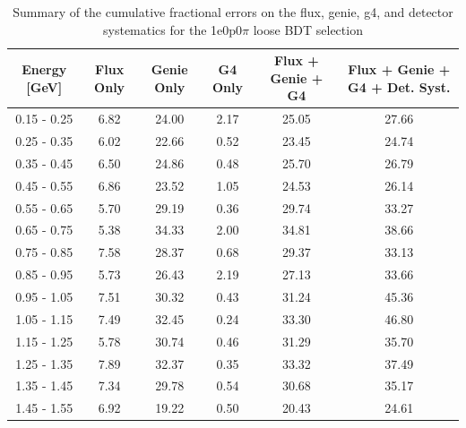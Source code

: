 \begin{table}[H]
\centering
\begin{tabular}{| c | c | c | c | c | c |}
\hline
Energy [GeV] & Flux Only & Genie Only  & G4 Only & Flux + Genie + G4 & Flux + Genie + G4 + Det. Syst. \\
\hline
0.15 - 0.25 & 6.82 & 24.00 & 2.17 & 25.05 & 27.66 \\
0.25 - 0.35 & 6.02 & 22.66 & 0.52 & 23.45 & 24.74 \\
0.35 - 0.45 & 6.50 & 24.86 & 0.48 & 25.70 & 26.79 \\
0.45 - 0.55 & 6.86 & 23.52 & 1.05 & 24.53 & 26.14 \\
0.55 - 0.65 & 5.70 & 29.19 & 0.36 & 29.74 & 33.27 \\
0.65 - 0.75 & 5.38 & 34.33 & 2.00 & 34.81 & 38.66 \\
0.75 - 0.85 & 7.58 & 28.37 & 0.68 & 29.37 & 33.13 \\
0.85 - 0.95 & 5.73 & 26.43 & 2.19 & 27.13 & 33.66 \\
0.95 - 1.05 & 7.51 & 30.32 & 0.43 & 31.24 & 45.36 \\
1.05 - 1.15 & 7.49 & 32.45 & 0.24 & 33.30 & 46.80 \\
1.15 - 1.25 & 5.78 & 30.74 & 0.46 & 31.29 & 35.70 \\
1.25 - 1.35 & 7.89 & 32.37 & 0.35 & 33.32 & 37.49 \\
1.35 - 1.45 & 7.34 & 29.78 & 0.54 & 30.68 & 35.17 \\
1.45 - 1.55 & 6.92 & 19.22 & 0.50 & 20.43 & 24.61 \\
\hline
\end{tabular}
\caption{Summary of the cumulative fractional errors on the flux, genie, g4, and detector systematics for the 1e0p0$\pi$ loose BDT selection}
\label{tab:1e0p0pi_bdtloose_errors}
\end{table}

